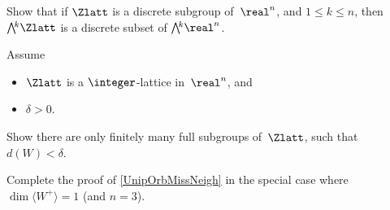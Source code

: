\begin{exercises}
\item \label{WedgeDiscrete}
Show that if $\Zlatt$ is a discrete subgroup of~$\real^n$, and $1 \le k \le n$, then $\bigwedge\!\!^k \Zlatt$ is a discrete subset of  $\bigwedge\!\!^k \real^n$.

\item \label{DisFiniteEx}
Assume
		\begin{itemize}
		\item $\Zlatt$ is a $\integer$-lattice in~$\real^n$,
		and
		\item $\delta > 0$.
		\end{itemize}
	Show there are only finitely many full subgroups of~$\Zlatt$, such that $d(W) < \delta$.
	
\item \label{dimWplus}
Complete the proof of \cref{UnipOrbMissNeigh} in the special case where $\dim \langle W^+ \rangle = 1$ (and $n = 3$). 

\end{exercises}









